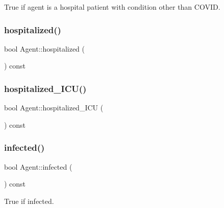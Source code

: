 True if agent is a hospital patient with condition other than C\+O\+V\+ID. 

\mbox{\label{classAgent_ad4253627a5c7f339f79617d9da7df34d}} 
\subsubsection{\texorpdfstring{hospitalized()}{hospitalized()}}
{\footnotesize\ttfamily bool Agent\+::hospitalized (\begin{DoxyParamCaption}{ }\end{DoxyParamCaption}) const\hspace{0.3cm}{\ttfamily [inline]}}

\mbox{\label{classAgent_a25a7e8adabf00b2de152410b6293e767}} 
\subsubsection{\texorpdfstring{hospitalized\+\_\+\+I\+C\+U()}{hospitalized\_ICU()}}
{\footnotesize\ttfamily bool Agent\+::hospitalized\+\_\+\+I\+CU (\begin{DoxyParamCaption}{ }\end{DoxyParamCaption}) const\hspace{0.3cm}{\ttfamily [inline]}}

\mbox{\label{classAgent_abb85f9353fdaa27e69606b3c1e8fa364}} 
\subsubsection{\texorpdfstring{infected()}{infected()}}
{\footnotesize\ttfamily bool Agent\+::infected (\begin{DoxyParamCaption}{ }\end{DoxyParamCaption}) const\hspace{0.3cm}{\ttfamily [inline]}}



True if infected. 

\mbox{\label{classAgent_a2ea370bc4e0ea8338e95f3548c593c1f}} 
